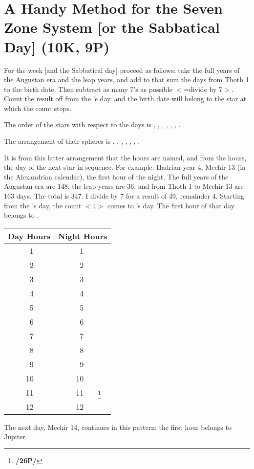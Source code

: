 \section{A Handy Method for the Seven Zone System [or the Sabbatical Day] (10K, 9P)}

For the week [and the Sabbatical day] proceed as follows: take the full years of the Augustan era and the leap years, and add to that sum the days from Thoth 1 to the birth date. Then subtract as many 7’s as possible $<$=divide by 7$>$. Count the result off from the \Sun’s day, and the birth date will belong to the star at which the count stops. 

The order of the stars with respect to the days is \Sun, \Moon, \Mars, \Mercury, \Jupiter, \Venus, \Saturn.

The arrangement of their spheres is \Saturn, \Jupiter, \Mars, \Sun, \Venus, \Mercury, \Moon.

\mnm[0.3cm]
It is from this latter arrangement that the hours are named, and from the hours, the day of the next star in sequence. For example: Hadrian year 4, Mechir 13 (in the Alexandrian calendar), the first hour of the night. The full years of the Augustan era are 148, the leap years are 36, and from Thoth 1 to Mechir 13 are 163 days. The total is 347. I divide by 7 for a result of 49, remainder 4. Starting from the \Sun’s day, the count $<$4$>$
comes to \Mercury’s day. The first hour of that day belongs to \Mercury.

\begin{longtable}[c]{|r|c|r|c|}
\hline
\multicolumn{2}{|c|}{Day Hours} & 
\multicolumn{2}{|c|}{Night Hours} \\
\hline
\endhead
1  & \Mercury	& 1  & \Sun		\\
2  & \Moon 		& 2  & \Venus	\\
3  & \Saturn 	& 3  & \Mercury	\\
4  & \Jupiter	& 4  & \Moon		\\
5  & \Mars		& 5  & \Saturn	\\
6  & \Sun			& 6  & \Jupiter	\\
7  & \Venus		& 7  & \Mars		\\
8  & \Mercury	& 8  & \Sun		\\
9  & \Moon		& 9  & \Venus	\\
10 & \Saturn		& 10 & \Mercury	\\
11 & \Jupiter	& 11 & \Moon\footnote{\textbf{/26P/}}	\\
12 & \Mars		& 12 & \Saturn	\\
\hline
\end{longtable}

The next day, Mechir 14, continues in this pattern: the first hour belongs to Jupiter.

\newpage